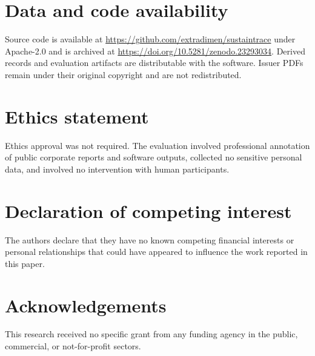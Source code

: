 \documentclass[a4paper,fleqn]{cas-sc}
\begin{document}
\section*{Data and code availability}
Source code is available at \url{https://github.com/extradimen/sustaintrace} under Apache-2.0 and
is archived at \url{https://doi.org/10.5281/zenodo.23293034}.
Derived records and evaluation artifacts are distributable with the software. Issuer PDFs remain
under their original copyright and are not redistributed.

\section*{Ethics statement}
Ethics approval was not required. The evaluation involved professional annotation of public
corporate reports and software outputs, collected no sensitive personal data, and involved no
intervention with human participants.

\section*{Declaration of competing interest}
The authors declare that they have no known competing financial interests or personal
relationships that could have appeared to influence the work reported in this paper.

\section*{Acknowledgements}
This research received no specific grant from any funding agency in the public, commercial, or
not-for-profit sectors.

\printcredits
\end{document}
